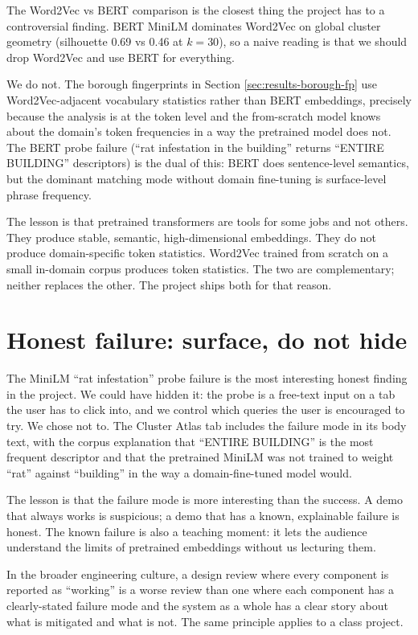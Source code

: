 \documentclass[11pt,letterpaper]{book}
\begin{document}
The Word2Vec vs BERT comparison is the closest thing the project has to a controversial finding. BERT MiniLM dominates Word2Vec on global cluster geometry (silhouette 0.69 vs 0.46 at $k = 30$), so a naive reading is that we should drop Word2Vec and use BERT for everything.

We do not. The borough fingerprints in Section \ref{sec:results-borough-fp} use Word2Vec-adjacent vocabulary statistics rather than BERT embeddings, precisely because the analysis is at the token level and the from-scratch model knows about the domain's token frequencies in a way the pretrained model does not. The BERT probe failure (``rat infestation in the building'' returns ``ENTIRE BUILDING'' descriptors) is the dual of this: BERT does sentence-level semantics, but the dominant matching mode without domain fine-tuning is surface-level phrase frequency.

The lesson is that pretrained transformers are tools for some jobs and not others. They produce stable, semantic, high-dimensional embeddings. They do not produce domain-specific token statistics. Word2Vec trained from scratch on a small in-domain corpus produces token statistics. The two are complementary; neither replaces the other. The project ships both for that reason.

\section{Honest failure: surface, do not hide}

The MiniLM ``rat infestation'' probe failure is the most interesting honest finding in the project. We could have hidden it: the probe is a free-text input on a tab the user has to click into, and we control which queries the user is encouraged to try. We chose not to. The Cluster Atlas tab includes the failure mode in its body text, with the corpus explanation that ``ENTIRE BUILDING'' is the most frequent descriptor and that the pretrained MiniLM was not trained to weight ``rat'' against ``building'' in the way a domain-fine-tuned model would.

The lesson is that the failure mode is more interesting than the success. A demo that always works is suspicious; a demo that has a known, explainable failure is honest. The known failure is also a teaching moment: it lets the audience understand the limits of pretrained embeddings without us lecturing them.

In the broader engineering culture, a design review where every component is reported as ``working'' is a worse review than one where each component has a clearly-stated failure mode and the system as a whole has a clear story about what is mitigated and what is not. The same principle applies to a class project.
\end{document}
